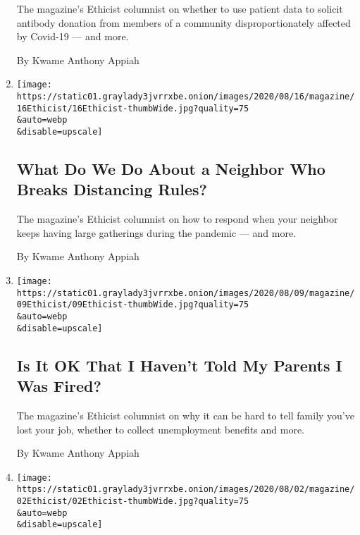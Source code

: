 \begin{enumerate}
  The magazine's Ethicist columnist on whether to use patient data to
  solicit antibody donation from members of a community
  disproportionately affected by Covid-19 --- and more.

  By Kwame Anthony Appiah
\item
  \href{/2020/08/11/magazine/what-do-we-do-about-a-neighbor-who-breaks-distancing-rules.html}{}

  \texttt{[image: https://static01.graylady3jvrrxbe.onion/images/2020/08/16/magazine/16Ethicist/16Ethicist-thumbWide.jpg?quality=75\\\&auto=webp\\\&disable=upscale]}

  \hypertarget{what-do-we-do-about-a-neighbor-who-breaks-distancing-rules}{%
  \subsection{What Do We Do About a Neighbor Who Breaks Distancing
  Rules?}\label{what-do-we-do-about-a-neighbor-who-breaks-distancing-rules}}

  The magazine's Ethicist columnist on how to respond when your neighbor
  keeps having large gatherings during the pandemic --- and more.

  By Kwame Anthony Appiah
\item
  \href{/2020/08/04/magazine/jobs-unemployment-ethics.html}{}

  \texttt{[image: https://static01.graylady3jvrrxbe.onion/images/2020/08/09/magazine/09Ethicist/09Ethicist-thumbWide.jpg?quality=75\\\&auto=webp\\\&disable=upscale]}

  \hypertarget{is-it-ok-that-i-havent-told-my-parents-i-was-fired}{%
  \subsection{Is It OK That I Haven't Told My Parents I Was
  Fired?}\label{is-it-ok-that-i-havent-told-my-parents-i-was-fired}}

  The magazine's Ethicist columnist on why it can be hard to tell family
  you've lost your job, whether to collect unemployment benefits and
  more.

  By Kwame Anthony Appiah
\item
  \href{/2020/07/28/magazine/can-my-boss-make-me-promise-i-dont-have-covid-19-symptoms.html}{}

  \texttt{[image: https://static01.graylady3jvrrxbe.onion/images/2020/08/02/magazine/02Ethicist/02Ethicist-thumbWide.jpg?quality=75\\\&auto=webp\\\&disable=upscale]}


\end{enumerate}
